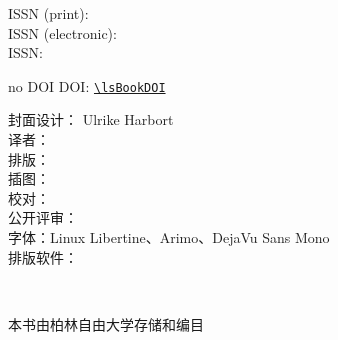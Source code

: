 {   %
  {}
  {ISSN (print): \lsISSNprint\\
   ISSN (electronic): \lsISSNelectronic\\}
  {}
  {ISSN: \lsISSN}


  {{\color{red} no DOI}}
  {DOI: \href{https://doi.org/\lsBookDOI}{\nolinkurl{\lsBookDOI}}}\\
%
\bigskip

封面设计： 
Ulrike Harbort \\
\if\@translator\empty\else
译者：
\@translator \\
\fi
\if\@typesetter\empty\else
排版：
\@typesetter \\
\fi
\if\@illustrator\empty\else
插图：
\@illustrator \\
\fi
\if\@proofreader\empty\else
校对：
\@proofreader \\
\fi
\if\@openreviewer\empty\else
公开评审：
\@openreviewer \\
\fi
字体：Linux Libertine、Arimo、DejaVu Sans Mono\lsAdditionalFontsImprint\\
排版软件：\XeLaTeX

\bigskip

\publisherstreetaddress\\
\publisherurl

\vfill

本书由柏林自由大学存储和编目 \\[3ex]

\\[3ex]



}
\makeatother

